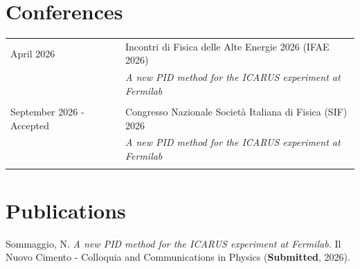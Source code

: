 \documentclass[a4paper,12pt]{article}
\begin{document}





\section{Conferences}

\begin{tabularx}{\linewidth}{@{}l X@{}}	
April 2026 & Incontri di Fisica delle Alte Energie 2026 (IFAE 2026) \\
& \textit{A new PID method for the ICARUS experiment at Fermilab} \\\\

September 2026 - Accepted & Congresso Nazionale Società Italiana di Fisica (SIF) 2026 \\
& \textit{A new PID method for the ICARUS experiment at Fermilab} \\\\

\end{tabularx}


\section{Publications}

Sommaggio, N. \textit{A new PID method for the ICARUS experiment at Fermilab.} Il Nuovo Cimento - Colloquia and Communications in Physics (\textbf{Submitted}, 2026).



\vfill
{}
\end{document}
